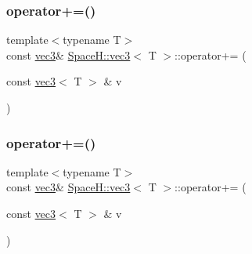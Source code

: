 \mbox{\label{struct_space_h_1_1vec3_a5a9143627e21c4b343b4ac44a5759cc8}} 
\subsubsection{\texorpdfstring{operator+=()}{operator+=()}\hspace{0.1cm}{\footnotesize\ttfamily [2/7]}}
{\footnotesize\ttfamily template$<$typename T$>$ \\
const \mbox{\hyperlink{struct_space_h_1_1vec3}{vec3}}\& \mbox{\hyperlink{struct_space_h_1_1vec3}{Space\+H\+::vec3}}$<$ T $>$\+::operator+= (\begin{DoxyParamCaption}\item[{const \mbox{\hyperlink{struct_space_h_1_1vec3}{vec3}}$<$ T $>$ \&}]{v }\end{DoxyParamCaption})\hspace{0.3cm}{\ttfamily [inline]}}

\mbox{\label{struct_space_h_1_1vec3_a5a9143627e21c4b343b4ac44a5759cc8}} 
\subsubsection{\texorpdfstring{operator+=()}{operator+=()}\hspace{0.1cm}{\footnotesize\ttfamily [3/7]}}
{\footnotesize\ttfamily template$<$typename T$>$ \\
const \mbox{\hyperlink{struct_space_h_1_1vec3}{vec3}}\& \mbox{\hyperlink{struct_space_h_1_1vec3}{Space\+H\+::vec3}}$<$ T $>$\+::operator+= (\begin{DoxyParamCaption}\item[{const \mbox{\hyperlink{struct_space_h_1_1vec3}{vec3}}$<$ T $>$ \&}]{v }\end{DoxyParamCaption})\hspace{0.3cm}{\ttfamily [inline]}}

\mbox{\label{struct_space_h_1_1vec3_a5a9143627e21c4b343b4ac44a5759cc8}} 
